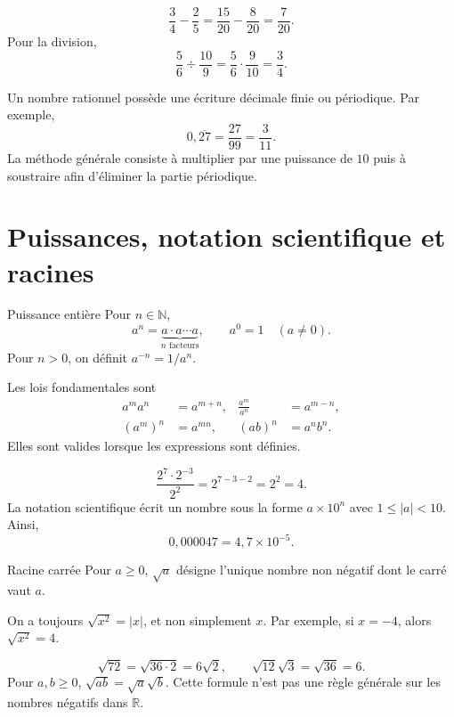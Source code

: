 \documentclass[12pt,a4paper,openany]{book}
\newcommand{\R}{\mathbb{R}}
\newcommand{\N}{\mathbb{N}}
\newcommand{\abs}[1]{\left\lvert #1\right\rvert}
\begin{document}
\begin{examplebox}
\[
\frac34-\frac25=\frac{15}{20}-\frac8{20}=\frac7{20}.
\]
Pour la division,
\[
\frac56\div\frac{10}{9}=\frac56\cdot\frac9{10}=\frac34.
\]
\end{examplebox}

Un nombre rationnel possède une écriture décimale finie ou périodique. Par exemple,
\[
0{,}\overline{27}=\frac{27}{99}=\frac3{11}.
\]
La méthode générale consiste à multiplier par une puissance de $10$ puis à soustraire afin d'éliminer la partie périodique.

\section{Puissances, notation scientifique et racines}

\begin{definition}{Puissance entière}{}
Pour $n\in\N$,
\[
a^n=\underbrace{a\cdot a\cdots a}_{n\text{ facteurs}},\qquad a^0=1\quad(a\neq0).
\]
Pour $n>0$, on définit $a^{-n}=1/a^n$.
\end{definition}

Les lois fondamentales sont
\begin{align*}
a^m a^n&=a^{m+n},&\frac{a^m}{a^n}&=a^{m-n},\\
(a^m)^n&=a^{mn},&(ab)^n&=a^n b^n.
\end{align*}
Elles sont valides lorsque les expressions sont définies.

\begin{examplebox}
\[
\frac{2^7\cdot2^{-3}}{2^2}=2^{7-3-2}=2^2=4.
\]
La notation scientifique écrit un nombre sous la forme $a\times10^n$ avec $1\le\abs a<10$. Ainsi,
\[
0{,}000047=4{,}7\times10^{-5}.
\]
\end{examplebox}

\begin{definition}{Racine carrée}{}
Pour $a\ge0$, $\sqrt a$ désigne l'unique nombre non négatif dont le carré vaut $a$.
\end{definition}

\begin{warningbox}
On a toujours $\sqrt{x^2}=\abs{x}$, et non simplement $x$. Par exemple, si $x=-4$, alors $\sqrt{x^2}=4$.
\end{warningbox}

\begin{examplebox}
\[
\sqrt{72}=\sqrt{36\cdot2}=6\sqrt2,
\qquad
\sqrt{12}\sqrt3=\sqrt{36}=6.
\]
Pour $a,b\ge0$, $\sqrt{ab}=\sqrt a\sqrt b$. Cette formule n'est pas une règle générale sur les nombres négatifs dans $\R$.
\end{examplebox}
\end{document}
